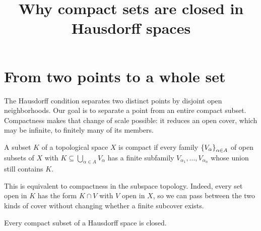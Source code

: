 \documentclass[11pt]{article}
\title{Why compact sets are closed in Hausdorff spaces}
\begin{document}
\maketitle

\section{From two points to a whole set}
The Hausdorff condition separates two distinct points by disjoint open
neighborhoods. Our goal is to separate a point from an entire compact
subset. Compactness makes that change of scale possible: it reduces an
open cover, which may be infinite, to finitely many of its members.

\begin{definition}\label{def:compact}
A subset $K$ of a topological space $X$ is compact if every family
$\left\{V_\alpha\right\}_{\alpha\in A}$ of open subsets of $X$ with
$K\subseteq\bigcup_{\alpha\in A}V_\alpha$ has a finite subfamily
$V_{\alpha_1},\ldots,V_{\alpha_n}$ whose union still contains $K$.
\end{definition}

This is equivalent to compactness in the subspace topology. Indeed,
every set open in $K$ has the form $K\cap V$ with $V$ open in $X$, so we
can pass between the two kinds of cover without changing whether a
finite subcover exists.

\begin{theorem}\label{thm:compact-closed}
Every compact subset of a Hausdorff space is closed.
\end{theorem}
\end{document}
